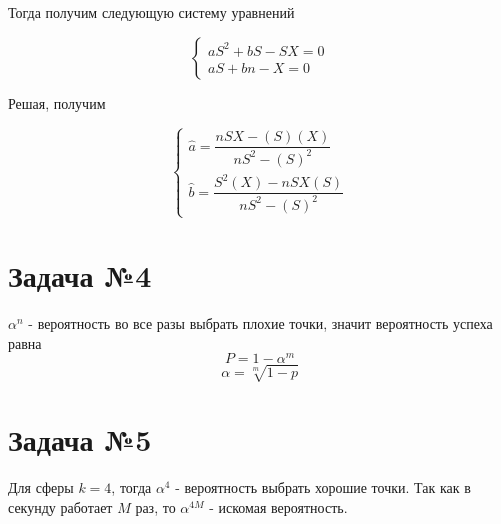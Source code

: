 \documentclass{article}
\begin{document}
Тогда получим следующую систему уравнений

$$
\begin{cases}
    a S^2 + b S - SX = 0 \\
    a S + bn - X = 0
\end{cases}
$$

Решая, получим 

$$
\begin{cases}
    \hat{a} = \dfrac{nSX - (S)(X)}{n S^2 - (S) ^ 2} \\
    \hat{b} = \dfrac{S^2 (X) - n SX (S)}{nS^2 - (S) ^ 2}
\end{cases}
$$

\section*{Задача №4} 
$\alpha^n$ - вероятность во все разы выбрать плохие точки, значит вероятность успеха равна
$$ P = 1 - \alpha^m $$
$$ \alpha = \sqrt[m]{1 - p} $$

\section*{Задача №5} 
Для сферы $k = 4$, тогда $\alpha^4$ - вероятность выбрать хорошие точки. Так как в секунду работает $M$ раз, то 
$\alpha ^{4M}$ - искомая вероятность.
\end{document}
